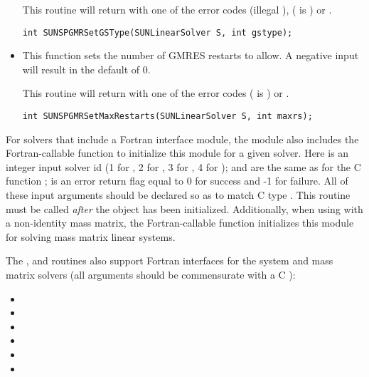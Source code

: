 \begin{itemize}
  This routine will return with one of the error codes
   (illegal ), 
  ( is ) or .
  
  \verb|int SUNSPGMRSetGSType(SUNLinearSolver S, int gstype);|



\item {}

  This function sets the number of GMRES restarts to 
  allow.  A negative input will result in the default of 0.

  This routine will return with one of the error codes
   ( is ) or .
  
  \verb|int SUNSPGMRSetMaxRestarts(SUNLinearSolver S, int maxrs);|

\end{itemize}
For solvers that include a Fortran interface module, the
{\sunlinsolspgmr} module also includes the Fortran-callable
function  to initialize
this {\sunlinsolspgmr} module for a given {\sundials} solver.
Here  is an integer input solver id (1 for {\cvode}, 2 for {\ida}, 3
for {\kinsol}, 4 for {\arkode});  and  are the
same as for the C function ;  is an error return
flag equal to 0 for success and -1 for failure.  All of these input
arguments should be declared so as to match C type .  This
routine must be called \emph{after} the {\nvector} object has been
initialized.  Additionally, when using {\arkode} with a non-identity
mass matrix, the Fortran-callable
function  initializes this 
{\sunlinsolspgmr} module for solving mass matrix linear systems.

The ,  and
 routines also support Fortran interfaces
for the system and mass matrix solvers (all arguments should be
commensurate with a C ):
\begin{itemize}
\item {}
\item {}
\item {}
\item {}
\item {}
\item {}
\end{itemize}
